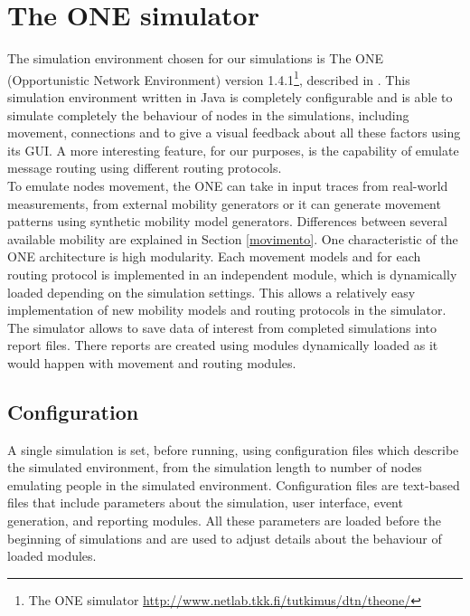 
\chapter{The ONE simulator}\label{simulatore} %



\graphicspath{{5-simulatore/img/}}


The simulation environment chosen for our simulations is The ONE (Opportunistic Network Environment) version 1.4.1\footnote{The ONE simulator \href{http://www.netlab.tkk.fi/tutkimus/dtn/theone/}{http://www.netlab.tkk.fi/tutkimus/dtn/theone/}}, described in \cite{articoloONE}. This simulation environment written in Java is completely configurable and is able to simulate completely the behaviour of nodes in the simulations, including movement, connections and to give a visual feedback about all these factors using its GUI. A more interesting feature, for our purposes, is the capability of emulate message routing using different routing protocols.
\\
 
To emulate nodes movement, the ONE can take in input traces from real-world measurements, from external mobility generators or it can generate movement patterns using synthetic mobility model generators. Differences between several available mobility are explained in Section \ref{movimento}. One characteristic of the ONE architecture is high modularity. Each movement models and for each routing protocol is implemented in an independent module, which is dynamically loaded depending on the simulation settings. This allows a relatively easy implementation of new mobility models and routing protocols in the simulator.
\\

The simulator allows to save data of interest from completed simulations into report files. There reports are created using modules dynamically loaded as it would happen with movement and routing modules.
\\

\section{Configuration}
\label{configurazioneONE}
A single simulation is set, before running, using configuration files which describe the simulated environment, from the simulation length to number of nodes emulating people in the simulated environment. Configuration files are text-based files that include parameters about the simulation, user interface, event generation, and reporting modules. All these parameters are loaded before the beginning of simulations and are used to adjust details about the behaviour of loaded modules.
\\

